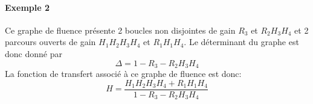 \paragraph{Exemple 2}

\begin{center}
\end{center}
Ce graphe de fluence présente 2 boucles non disjointes de gain $R_3$ et $R_2H_3H_4$ 
et 2 parcours ouverts de gain $H_1H_2H_3H_4$ et $R_1H_1H_4$.
Le déterminant du graphe est donc donné par 
$$
\Delta=1-R_3-R_2H_3H_4
$$
La fonction de transfert associé à ce graphe de fluence est donc:
$$
H=\dfrac{H_1H_2H_3H_4+R_1H_1H_4}{1-R_3-R_2H_3H_4}
$$

